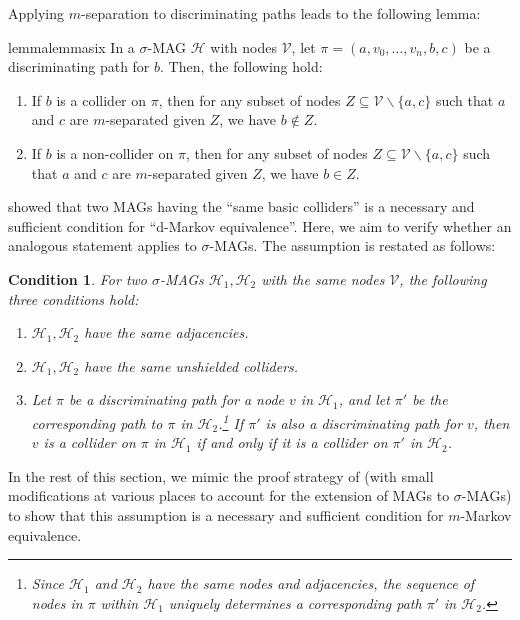 \documentclass[accepted]{uai2025} %
\newtheorem{condition}{Condition}
\begin{document}
Applying $m$-separation to discriminating paths leads to the following lemma:

\begin{restatable}{lemma}{lemmasix} \label{lemma6}
In a $\sigma$-MAG $\mathcal{H}$ with nodes $\mathcal{V}$, let $\pi=(a,v_0,\ldots,v_n,b,c)$ be a discriminating path for $b$. Then, the following hold:
\begin{enumerate}
    \item If $b$ is a collider on $\pi$, then for any subset of nodes $Z \subseteq \mathcal{V}\backslash\{a,c\}$ such that $a$ and $c$ are $m$-separated given $Z$, we have  $b \notin Z$.
    \item If $b$ is a non-collider on $\pi$, then for any subset of nodes $Z \subseteq \mathcal{V}\backslash\{a,c\}$ such that $a$ and $c$ are $m$-separated given $Z$, we have $b \in Z$.
\end{enumerate}
\end{restatable}

\citet{spirtes1996polynomial} showed that two MAGs having the ``same basic colliders'' is a necessary and sufficient condition for ``d-Markov equivalence''. Here, we aim to verify whether an analogous statement applies to $\sigma$-MAGs. The assumption is restated as follows:

\begin{condition} \label{condition}
For two $\sigma$-MAGs $\mathcal{H}_1,\mathcal{H}_2$  with the same nodes $\mathcal{V}$, the following three conditions hold:
\begin{enumerate}
    \item $\mathcal{H}_1,\mathcal{H}_2$ have the same adjacencies.
    \item $\mathcal{H}_1,\mathcal{H}_2$ have the same unshielded colliders.
    \item Let \( \pi \) be a discriminating path for a node \( v \) in \( \mathcal{H}_1 \), and let \( \pi' \) be the corresponding path to \( \pi \) in \( \mathcal{H}_2 \).\footnote{Since \( \mathcal{H}_1 \) and \( \mathcal{H}_2 \) have the same nodes and adjacencies, the sequence of nodes in \( \pi \) within \( \mathcal{H}_1 \) uniquely determines a corresponding path \( \pi' \) in \( \mathcal{H}_2 \).} If \( \pi' \) is also a discriminating path for \( v \), then \( v \) is a collider on \( \pi \) in \( \mathcal{H}_1 \) if and only if it is a collider on \( \pi' \) in \( \mathcal{H}_2 \).
\end{enumerate}
\end{condition}
In the rest of this section, we mimic the proof strategy of \citet{spirtes1996polynomial} (with small modifications at various places to account for the extension of MAGs to $\sigma$-MAGs) to show that this assumption is a necessary and sufficient condition for $m$-Markov equivalence.
\end{document}
